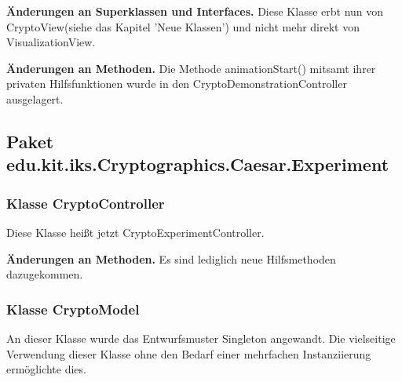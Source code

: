 \documentclass{article}
\begin{document}
	    \textbf{Änderungen an Superklassen und Interfaces.}\newline
	     Diese Klasse erbt nun von CryptoView(siehe das Kapitel 'Neue Klassen') und nicht mehr direkt von VisualizationView.\newline
	   
	    \textbf{Änderungen an Methoden.}\newline
	     Die Methode animationStart() mitsamt ihrer privaten Hilfsfunktionen wurde in den CryptoDemonstrationController ausgelagert.

  \subsection{Paket edu.kit.iks.Cryptographics.Caesar.Experiment}

	\subsubsection{Klasse CryptoController}
          Diese Klasse heißt jetzt CryptoExperimentController.\newline
          
          \textbf{Änderungen an Methoden.}\newline
           Es sind lediglich neue Hilfsmethoden dazugekommen.
	\subsubsection{Klasse CryptoModel}
	 An dieser Klasse wurde das Entwurfsmuster Singleton angewandt. Die vielseitige Verwendung dieser Klasse 
	 ohne den Bedarf einer mehrfachen Instanziierung ermöglichte dies.\newline 
	 
\end{document}

